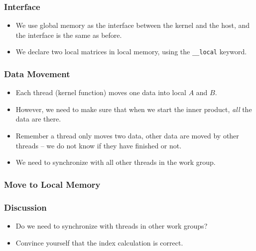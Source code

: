 \documentclass{beamer}
\begin{document}
\begin{frame}
\end{frame}

\begin{frame}
  \frametitle{Interface}
  \begin{itemize}
    \item We use global memory as the interface between the kernel and
      the host, and the interface is the same as before.
    \item We declare two local matrices in local memory, using the
      {\tt \_\_local} keyword.
  \end{itemize}
\end{frame}

\begin{frame}
\end{frame}

\begin{frame}
  \frametitle{Data Movement}
  \begin{itemize}
    \item Each thread (kernel function) moves one data into local $A$
      and $B$.
    \item However, we need to make sure that when we start the inner
      product, {\em all} the data are there.
    \item Remember a thread only moves two data, other data are moved
      by other threads -- we do not know if they have finished or not.
    \item We need to synchronize with all other threads in the work group.
  \end{itemize}
\end{frame}

\begin{frame}
\end{frame}

\begin{frame}
  \frametitle{Move to Local Memory}
  \centerline{}
\end{frame}


\begin{frame}
  \frametitle{Discussion}
  \begin{itemize}
    \item Do we need to synchronize with threads in other work groups?
    \item Convince yourself that the index calculation is correct.
  \end{itemize}
\end{frame}
\end{document}
